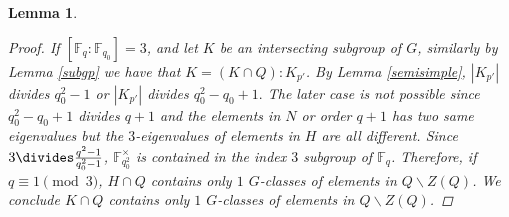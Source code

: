\documentclass[12pt,reqno]{amsart}
\newcommand{\FF}{\mathbb{F}}
\theoremstyle{plain}
\newtheorem{lemma}[proposition]{Lemma}
\theoremstyle{definition}
\begin{document}
\begin{lemma}
\begin{proof}
	If $[\FF_q{:}\FF_{q_0}]=3$, and let $K$ be an intersecting subgroup of $G$, similarly by Lemma \ref{subgp} we have that $K=(K\cap Q){:}K_{p'}$. By Lemma \ref{semisimple},
    $|K_{p'}|$ divides $q_0^2-1$ or $|K_{p'}|$ divides $q_0^2-q_0+1.$ 
    The later case is not possible since $q_0^2-q_0+1$ divides $q+1$ and the elements in  $N$ or order $q+1$ has two same eigenvalues but the $3$-eigenvalues of  elements in $H$ are all different.
    Since $3\divides\frac{q^2-1}{q_0^2-1}$, $\FF_{q_0^2}^{\times}$ is contained in the index $3$ subgroup of $\FF_q$. Therefore, if $q\equiv 1 \pmod 3$, $H\cap Q$ contains only $1$ $G$-classes of elements in $Q\backslash Z(Q)$. We conclude $K\cap Q$ contains only $1$ $G$-classes of elements in $Q\backslash Z(Q)$. 
\end{proof}
\end{lemma} 


		
		
\end{document}
